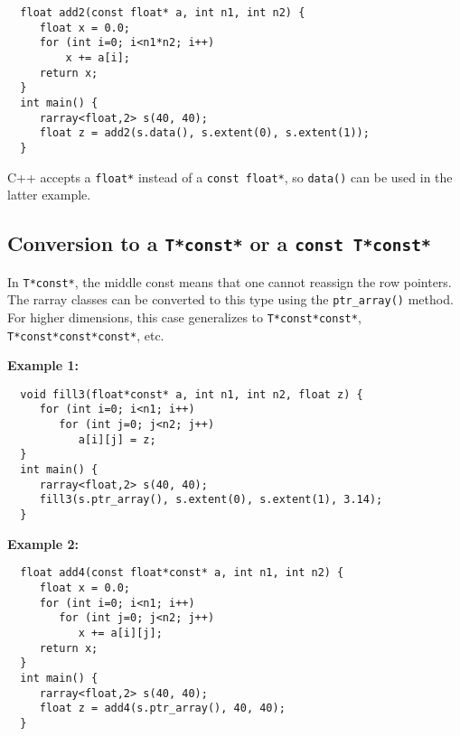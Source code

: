 \documentclass[11pt,twoside]{article}
\begin{document}
\vspace{-5pt}\begin{framed}\vspace{-14pt}%
\begin{verbatim}
  float add2(const float* a, int n1, int n2) {
     float x = 0.0;
     for (int i=0; i<n1*n2; i++)
         x += a[i];
     return x;
  }
  int main() {
     rarray<float,2> s(40, 40);
     float z = add2(s.data(), s.extent(0), s.extent(1));
  }
\end{verbatim}%
\vspace{-14pt}\end{framed}\vspace{-8pt}

\noindent
C++ accepts a \texttt{float*} instead of a \texttt{const float*}, so \texttt{data()} can be used in the latter example.

\subsection{Conversion to a {\tt T*const*} or a {\tt const T*const*} }

\noindent
In \texttt{T*const*}, the middle const means that one cannot reassign the row pointers.
The rarray classes can be converted to this type using the \texttt{ptr\_array()} method. 
For higher dimensions, this case generalizes to \texttt{T*const*const*}, \texttt{T*const*const*const*}, etc.

\noindent
{\bf Example 1:}
\vspace{-5pt}\begin{framed}\vspace{-14pt}%
\begin{verbatim}
  void fill3(float*const* a, int n1, int n2, float z) {
     for (int i=0; i<n1; i++)
        for (int j=0; j<n2; j++)
           a[i][j] = z;
  }
  int main() {
     rarray<float,2> s(40, 40);
     fill3(s.ptr_array(), s.extent(0), s.extent(1), 3.14);
  }
\end{verbatim}%
\vspace{-14pt}\end{framed}\vspace{-8pt}

\noindent
{\bf Example 2:}
\vspace{-5pt}\begin{framed}\vspace{-14pt}%
\begin{verbatim}
  float add4(const float*const* a, int n1, int n2) {
     float x = 0.0;
     for (int i=0; i<n1; i++)
        for (int j=0; j<n2; j++)
           x += a[i][j];
     return x;
  }
  int main() {
     rarray<float,2> s(40, 40);
     float z = add4(s.ptr_array(), 40, 40);
  }
\end{verbatim}%
\vspace{-14pt}
\end{framed}
\end{document}
